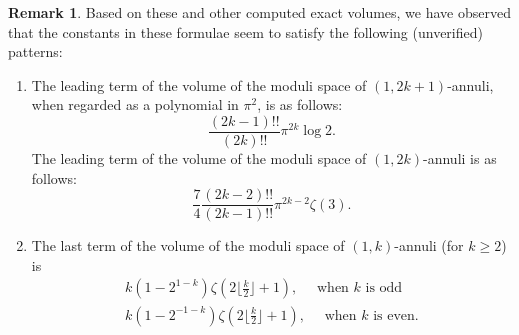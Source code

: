 \documentclass{amsart}
\theoremstyle{definition}
\newtheorem{remark}[proposition]{Remark}
\begin{document}
\begin{remark}
    
Based on these and other computed exact volumes, we have observed that the constants in these formulae seem to satisfy the following (unverified) patterns:

\begin{enumerate}
\item
The leading term of the volume of the moduli space of $(1,2k+1)$-annuli, when regarded as a polynomial in $\pi^2$, is as follows:
\[
\frac{(2k-1)!!}{(2k)!!}\pi^{2k}\log2.
\]
The leading term of the volume of the moduli space of $(1,2k)$-annuli is as follows:
\[
\frac{7}{4}\frac{(2k-2)!!}{(2k-1)!!}\pi^{2k-2}\zeta(3).
\]
\item 
The last term of the volume of the moduli space of $(1,k)$-annuli (for $k\geqslant 2$) is
    \begin{align*}
    k(1-2^{1-k})\zeta(2\lfloor \tfrac{k}{2}\rfloor+1),\quad \text{ when }k\text{ is odd}\\
    k(1-2^{-1-k})\zeta(2\lfloor \tfrac{k}{2}\rfloor+1),\quad \text{ when }k\text{ is even.}
    \end{align*}


\end{enumerate}
\end{remark}
\end{document}
